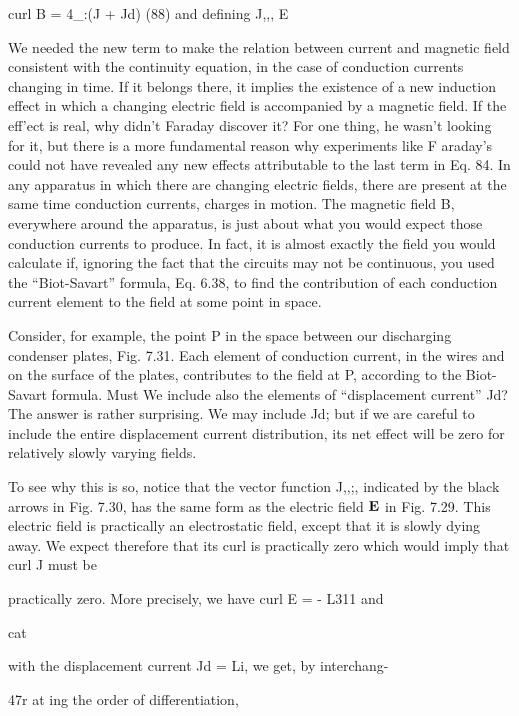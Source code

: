 \begin{equation}
\end{equation}
curl B = 4_:(J + Jd) (88)
and defining J,,, E 

We needed the new term to make the relation between current and
magnetic field consistent with the continuity equation, in the case
of conduction currents changing in time. If it belongs there, it
implies the existence of a new induction effect in which a changing
electric field is accompanied by a magnetic field. If the eff'ect is real,
why didn't Faraday discover it? For one thing, he wasn't looking
for it, but there is a more fundamental reason why experiments like
F araday's could not have revealed any new effects attributable to the
last term in Eq. 84. In any apparatus in which there are changing
electric fields, there are present at the same time conduction currents,
charges in motion. The magnetic field B, everywhere around the
apparatus, is just about what you would expect those conduction
currents to produce. In fact, it is almost exactly the field you would
calculate if, ignoring the fact that the circuits may not be continuous,
you used the ``Biot-Savart'' formula, Eq. 6.38, to find the contribution
of each conduction current element to the field at some point in space.

Consider, for example, the point P in the space between our discharging
condenser plates, Fig. 7.31. Each element of conduction
current, in the wires and on the surface of the plates, contributes to
the field at P, according to the Biot-Savart formula. Must We include
also the elements of ``displacement current'' Jd? The answer is rather
surprising. We may include Jd; but if we are careful to include the
entire displacement current distribution, its net effect will be zero for
relatively slowly varying fields.

To see why this is so, notice that the vector function J,,;, indicated
by the black arrows in Fig. 7.30, has the same form as the electric
field $\mathbf{E}$ in Fig. 7.29. This electric field is practically an electrostatic
field, except that it is slowly dying away. We expect therefore that
its curl is practically zero which would imply that curl J must be

practically zero. More precisely, we have curl E = - L311 and

cat

with the displacement current Jd = Li, we get, by interchang-

47r at
ing the order of differentiation,

